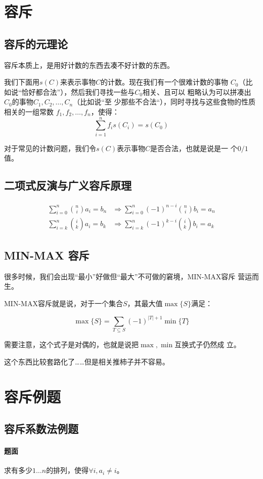 \section{容斥}
\subsection{容斥的元理论}
容斥本质上，是用好计数的东西去凑不好计数的东西。\par
我们下面用$s(C)$来表示事物$C$的计数。现在我们有一个很难计数的事物
$C_0$（比如说“恰好都合法”），然后我们寻找一些与$C_0$相关、且可以
粗略认为可以拼凑出$C_0$的事物$C_1, C_2, \ldots, C_n$（比如说“至
少那些不合法“），同时寻找与这些食物的性质相关的一组常数
$f_1, f_2, \ldots, f_n$，使得：
\[\sum_{i = 1}^n f_i s(C_i) = s(C_0)\]\par
对于常见的计数问题，我们令$s(C)$表示事物$C$是否合法，也就是说是一
个$0/1$值。
\subsection{二项式反演与广义容斥原理}
\[
\begin{aligned}
\sum_{i = 0}^n\binom n i a_i = b_n&\Longrightarrow
\sum_{i = 0}^n(-1)^{n - i}\binom n i b_i = a_n\\
\sum_{i = k}^n\binom i k a_i = b_k&\Longrightarrow
\sum_{i = k}^n(-1)^{k - i}\binom i k b_i = a_k
\end{aligned}
\]
\subsection{MIN-MAX 容斥}
很多时候，我们会出现“最小”好做但“最大”不可做的窘境，MIN-MAX容斥
营运而生。\par
MIN-MAX容斥就是说，对于一个集合$S$，其最大值$\max\{S\}$满足：\par
\[\max\{S\} = \sum_{T\subseteq S} (-1)^{|T| + 1}\min\{T\}\]\par
需要注意，这个式子是对偶的，也就是说把$\max,\min$互换式子仍然成
立。\par
这个东西比较套路化了……但是相关推柿子并不容易。

\section{容斥例题}
\subsection{容斥系数法例题}
\paragraph{题面}
求有多少\(1\ldots n\)的排列，使得\(\forall i, a_i\ne i\)。
